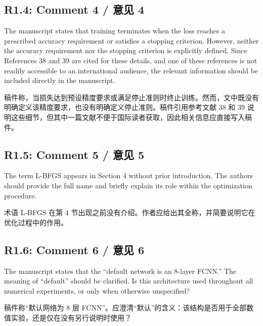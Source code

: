 \documentclass[11pt,a4paper,twoside]{article}
\begin{document}
\subsection{R1.4: Comment 4 / 意见 4}
\begin{englishcomment}
The manuscript states that training terminates when the loss reaches a prescribed accuracy requirement or satisfies a stopping criterion. However, neither the accuracy requirement nor the stopping criterion is explicitly defined. Since References 38 and 39 are cited for these details, and one of these references is not readily accessible to an international audience, the relevant information should be included directly in the manuscript.
\end{englishcomment}
\begin{chinesecomment}
稿件称，当损失达到预设精度要求或满足停止准则时终止训练。然而，文中既没有明确定义该精度要求，也没有明确定义停止准则。稿件引用参考文献 38 和 39 说明这些细节，但其中一篇文献不便于国际读者获取，因此相关信息应直接写入稿件。
\end{chinesecomment}
\begin{revisionidea}
\end{revisionidea}

\subsection{R1.5: Comment 5 / 意见 5}
\begin{englishcomment}
The term L-BFGS appears in Section 4 without prior introduction. The authors should provide the full name and briefly explain its role within the optimization procedure.
\end{englishcomment}
\begin{chinesecomment}
术语 L-BFGS 在第 4 节出现之前没有介绍。作者应给出其全称，并简要说明它在优化过程中的作用。
\end{chinesecomment}
\begin{revisionidea}
\end{revisionidea}

\subsection{R1.6: Comment 6 / 意见 6}
\begin{englishcomment}
The manuscript states that the ``default network is an 8-layer FCNN.'' The meaning of ``default'' should be clarified. Is this architecture used throughout all numerical experiments, or only when otherwise unspecified?
\end{englishcomment}
\begin{chinesecomment}
稿件称“默认网络为 8 层 FCNN”。应澄清“默认”的含义：该结构是否用于全部数值实验，还是仅在没有另行说明时使用？
\end{chinesecomment}
\begin{revisionidea}
\end{revisionidea}
\end{document}
